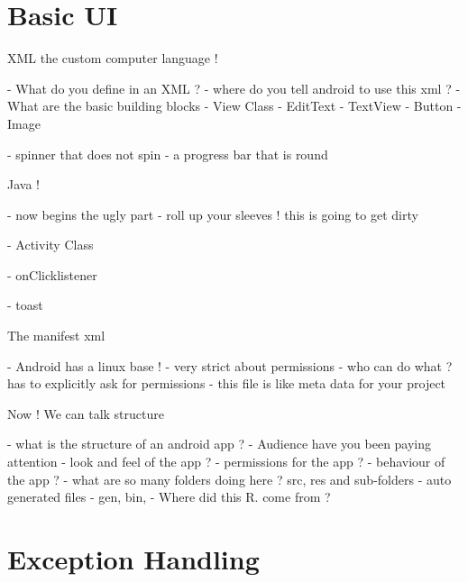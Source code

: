 \documentclass[11pt]{beamer}
\begin{document}
\section{Basic UI}

\begin{frame}[containsverbatim]{XML the custom computer language !}

- What do you define in an XML ?
- where do you tell android to use this xml ?
- What are the basic building blocks
- View Class
- EditText
- TextView
- Button
- Image 

- spinner that does not spin 
- a progress bar that is round
\end{frame}



\begin{frame}[containsverbatim]{Java !}

- now begins the ugly part 
- roll up your sleeves ! this is going to get dirty


- Activity Class

- onClicklistener

- toast 
\end{frame}

\begin{frame}[containsverbatim]{The manifest xml}

- Android has a linux base !
- very strict about permissions
- who can do what ? has to explicitly ask for permissions
- this file is like meta data for your project

\end{frame}

\begin{frame}[containsverbatim]{Now ! We can talk structure }

- what is the structure of an android app ?
- Audience have you been paying attention
- look and feel of the app ?
- permissions for the app ?
- behaviour of the app ?
- what are so many folders doing here ? 
	src, res and sub-folders
- auto generated files
- gen, bin, 
- Where did this R. come from ?

\end{frame}


\section{Exception Handling}
\end{document}
